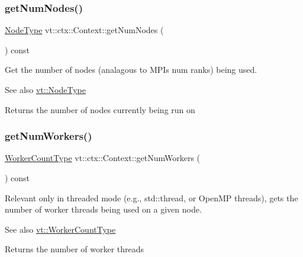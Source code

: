 \subsubsection{\texorpdfstring{get\+Num\+Nodes()}{getNumNodes()}}
{\footnotesize\ttfamily \hyperlink{namespacevt_a866da9d0efc19c0a1ce79e9e492f47e2}{Node\+Type} vt\+::ctx\+::\+Context\+::get\+Num\+Nodes (\begin{DoxyParamCaption}{ }\end{DoxyParamCaption}) const\hspace{0.3cm}{\ttfamily [inline]}}



Get the number of nodes (analagous to M\+PI\textquotesingle{}s num ranks) being used. 

\begin{DoxySeeAlso}{See also}
{\ttfamily \hyperlink{namespacevt_a866da9d0efc19c0a1ce79e9e492f47e2}{vt\+::\+Node\+Type}} 
\end{DoxySeeAlso}
\begin{DoxyReturn}{Returns}
the number of nodes currently being run on 
\end{DoxyReturn}
\mbox{\label{structvt_1_1ctx_1_1_context_a0ea881fa8c4d8fee74e85d8a6c52a6f0}} 
\subsubsection{\texorpdfstring{get\+Num\+Workers()}{getNumWorkers()}}
{\footnotesize\ttfamily \hyperlink{namespacevt_aa93398ea48f2cb6c188512250f7cc248}{Worker\+Count\+Type} vt\+::ctx\+::\+Context\+::get\+Num\+Workers (\begin{DoxyParamCaption}{ }\end{DoxyParamCaption}) const\hspace{0.3cm}{\ttfamily [inline]}}



Relevant only in threaded mode (e.\+g., {\ttfamily std\+::thread}, or Open\+MP threads), gets the number of worker threads being used on a given node. 

\begin{DoxySeeAlso}{See also}
{\ttfamily \hyperlink{namespacevt_aa93398ea48f2cb6c188512250f7cc248}{vt\+::\+Worker\+Count\+Type}} 
\end{DoxySeeAlso}
\begin{DoxyReturn}{Returns}
the number of worker threads 
\end{DoxyReturn}
\mbox{\label{structvt_1_1ctx_1_1_context_a1e39e0561109fd30b45a427ddb055cd2}} 
